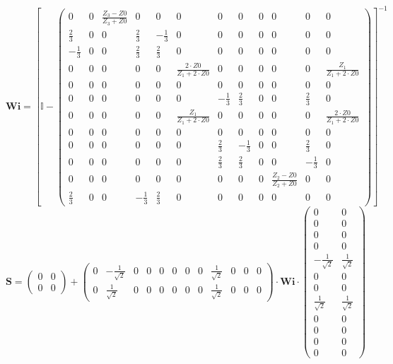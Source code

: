 \[ \mathbf{Wi} =  \left[ \mathbb{I}  - \left(\begin{smallmatrix} 0 & 0
& \frac{ Z_3 -Z0}{ Z_3 +Z0} & 0 & 0 & 0 & 0 & 0 & 0 & 0 & 0 & 0 \\
\frac{2}{3} & 0 & 0 & \frac{2}{3} & -\frac{1}{3} & 0 & 0 & 0 & 0 & 0 &
0 & 0 \\ -\frac{1}{3} & 0 & 0 & \frac{2}{3} & \frac{2}{3} & 0 & 0 & 0
& 0 & 0 & 0 & 0 \\ 0 & 0 & 0 & 0 & 0 & \frac{2\cdot Z0}{Z_1+2\cdot Z0}
& 0 & 0 & 0 & 0 & 0 & \frac{Z_1}{Z_1+2\cdot Z0} \\ 0 & 0 & 0 & 0 & 0 &
0 & 0 & 0 & 0 & 0 & 0 & 0 \\ 0 & 0 & 0 & 0 & 0 & 0 & -\frac{1}{3} &
\frac{2}{3} & 0 & 0 & \frac{2}{3} & 0 \\ 0 & 0 & 0 & 0 & 0 &
\frac{Z_1}{Z_1+2\cdot Z0} & 0 & 0 & 0 & 0 & 0 & \frac{2\cdot
Z0}{Z_1+2\cdot Z0} \\ 0 & 0 & 0 & 0 & 0 & 0 & 0 & 0 & 0 & 0 & 0 & 0 \\
0 & 0 & 0 & 0 & 0 & 0 & \frac{2}{3} & -\frac{1}{3} & 0 & 0 &
\frac{2}{3} & 0 \\ 0 & 0 & 0 & 0 & 0 & 0 & \frac{2}{3} & \frac{2}{3} &
0 & 0 & -\frac{1}{3} & 0 \\ 0 & 0 & 0 & 0 & 0 & 0 & 0 & 0 & 0 & \frac{
Z_2 -Z0}{ Z_2 +Z0} & 0 & 0 \\ \frac{2}{3} & 0 & 0 & -\frac{1}{3} &
\frac{2}{3} & 0 & 0 & 0 & 0 & 0 & 0 & 0 \end{smallmatrix}\right)
\right]^{-1}  \]
\[ \mathbf{S} = \left(\begin{smallmatrix} 0 & 0 \\ 0 & 0
\end{smallmatrix}\right) + \left(\begin{smallmatrix} 0 &
-\frac{1}{\sqrt{2}} & 0 & 0 & 0 & 0 & 0 & 0 & \frac{1}{\sqrt{2}} & 0 &
0 & 0 \\ 0 & \frac{1}{\sqrt{2}} & 0 & 0 & 0 & 0 & 0 & 0 &
\frac{1}{\sqrt{2}} & 0 & 0 & 0 \end{smallmatrix}\right) \cdot
\mathbf{Wi} \cdot\left(\begin{smallmatrix} 0 & 0 \\ 0 & 0 \\ 0 & 0 \\
0 & 0 \\ -\frac{1}{\sqrt{2}} & \frac{1}{\sqrt{2}} \\ 0 & 0 \\ 0 & 0 \\
\frac{1}{\sqrt{2}} & \frac{1}{\sqrt{2}} \\ 0 & 0 \\ 0 & 0 \\ 0 & 0 \\
0 & 0 \end{smallmatrix}\right) \]
